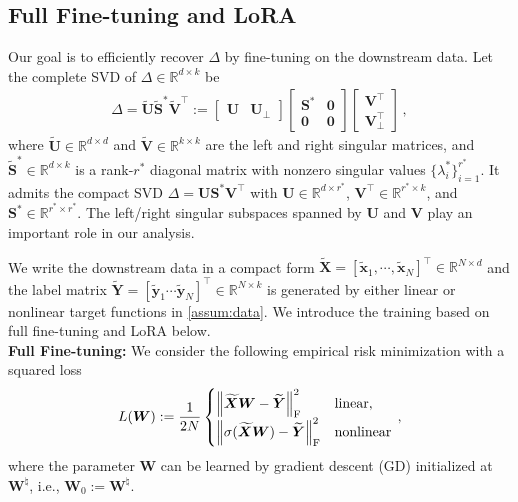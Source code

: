 \subsection{Full Fine-tuning and LoRA}
Our goal is to efficiently recover $\Delta$ by fine-tuning on the downstream data. 
Let the complete SVD of $\Delta \in \mathbb{R}^{d \times k}$ be
\begin{align}
\Delta = \widetilde{\bm U} \widetilde{\bm S}^* \widetilde{\bm V}^{\!\top}:=
    \begin{bmatrix}
        \bm U & \bm U_\perp
    \end{bmatrix}\begin{bmatrix}
       \bm S^* & \bm 0 \\
        \bm 0 & \bm 0
    \end{bmatrix}  \begin{bmatrix}
        \bm V^{\!\top} \\ \bm V_\perp^{\!\top}
    \end{bmatrix}\,,\label{Delta-SVD}
\end{align}
where $\widetilde{\bm U} \in \mathbb{R}^{d \times d}$ and $\widetilde{\bm V} \in \mathbb{R}^{k \times k}$ are the left and right singular matrices, and $\widetilde{\bm S}^* \in \mathbb{R}^{d \times k}$ is a rank-$r^*$ diagonal matrix with nonzero singular values $\{ \lambda^*_i \}_{i=1}^{r^*}$. It admits the compact SVD $\Delta = \bm U \bm S^* \bm V^{\!\top}$ with $\bm U \in \mathbb{R}^{d \times r^*}$, $\bm V^{\!\top} \in \mathbb{R}^{r^* \times k}$, and $\bm S^* \in \mathbb{R}^{r^* \times r^*}$.
The left/right singular subspaces spanned by $\bm U$ and $\bm V$ play an important role in our analysis.

We write the downstream data in a compact form $\widetilde{\bm X} = [\widetilde{\bm x}_1, \cdots, \widetilde{\bm x}_N]^{\!\top} \in \mathbb{R}^{N \times d}$ and the label matrix $\widetilde{\bm Y} =[
    \widetilde{\bm y}_1 \cdots \widetilde{\bm y}_N]^{\!\top} \in \mathbb{R}^{N \times k}$ is generated by either linear or nonlinear target functions in \cref{assum:data}.
We introduce the training based on full fine-tuning and LoRA below.\\

\noindent
{\bf Full Fine-tuning:}  We consider the following empirical risk minimization with a squared loss
\begin{equation}\label{eq:fulllinear}
 L(\bm W) := \frac{1}{2N}
\begin{cases}
\left\| \widetilde{\bm X} \bm W -\widetilde{\bm Y}\right\|_{\rm F}^2 & \text{linear}, \\ 
\left\| \sigma(\widetilde{\bm X} \bm W) -\widetilde{\bm Y}\right\|_{\rm F}^2 & \text{nonlinear}
\end{cases}\,,      
\end{equation}
where the parameter $\bm W$ can be learned by gradient descent (GD) initialized at $\bm W^{\natural}$, i.e., $\bm W_0 := \bm W^{\natural}$.\\

